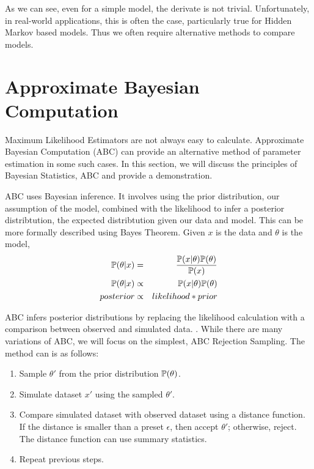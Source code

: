     As we can see, even for a simple model, the derivate is not trivial. Unfortunately, in real-world applications, this is often the case, particularly true for Hidden Markov based models. Thus we often require alternative methods to compare models.


\section{Approximate Bayesian Computation}
\label{Model_Selection:Approximate_Bayesian_Computation}

Maximum Likelihood Estimators are not always easy to calculate. Approximate Bayesian Computation (ABC) can provide an alternative method of parameter estimation in some such cases. In this section, we will discuss the principles of Bayesian Statistics, ABC and provide a demonstration.

ABC uses Bayesian inference. It involves using the prior distribution, our assumption of the model, combined with the likelihood to infer a posterior distribtution, the expected distribtution given our data and model. This can be more formally described using Bayes Theorem. Given $x$ is the data and $\theta$ is the model, 
\begin{eqnarray}
    \mathbb{P}(\theta|x) & = & \dfrac{\mathbb{P}(x|\theta)\mathbb{P}(\theta)}{\mathbb{P}(x)} \\
    \mathbb{P}(\theta|x) & \propto & \mathbb{P}(x|\theta)\mathbb{P}(\theta) \\
    posterior  & \propto & likelihood * prior
\end{eqnarray}

ABC infers posterior distributions by replacing the likelihood calculation with a comparison between observed and simulated data. \cite{Toni2009}. While there are many variations of ABC, we will focus on the simplest, ABC Rejection Sampling. The method can is as follows:

\begin{enumerate}
    \label{Model_Selection:Approximate_Bayesian_Computation:Method}
    \item Sample $\theta'$ from the prior distribution $\mathbb{P}(\theta)$.
    \item Simulate dataset $x'$ using the sampled $\theta'$.
    \item Compare simulated dataset with observed dataset using a distance function. If the distance is smaller than a preset $\epsilon$, then accept $\theta'$; otherwise, reject. The distance function can use summary statistics.
    \item Repeat previous steps.
\end{enumerate}

